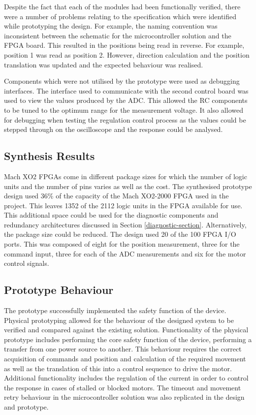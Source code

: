 Despite the fact that each of the modules had been functionally verified, there were a number of problems relating to the specification which were identified while prototyping the design. For example, the naming convention was inconsistent between the schematic for the microcontroller solution and the FPGA board. This resulted in the positions being read in reverse. For example, position 1 was read as position 2. However, direction calculation and the position translation was updated and the expected behaviour was realised.

Components which were not utilised by the prototype were used as debugging interfaces. The interface used to communicate with the second control board was used to view the values produced by the ADC. This allowed the RC components to be tuned to the optimum range for the measurement voltage. It also allowed for debugging when testing the regulation control process as the values could be stepped through on the oscilloscope and the response could be analysed.

\subsection{Synthesis Results}

Mach XO2 FPGAs come in different package sizes for which the number of logic units and the number of pins varies as well as the cost. The synthesised prototype design used 36\% of the capacity of the Mach XO2-2000 FPGA used in the project. This leaves 1352 of the 2112 logic units in the FPGA available for use. This additional space could be used for the diagnostic components and redundancy architectures discussed in Section \ref{diagnostic-section}. Alternatively, the package size could be reduced. The design used 20 of the
100 FPGA I/O ports. This was composed of eight for the position measurement, three for the command input, three for each of the ADC measurements and six for the motor control signals.

\subsection{Prototype Behaviour}
The prototype successfully implemented the safety function of the device. Physical prototyping allowed for the behaviour of the designed system to be verified and compared against the existing solution. Functionality of the physical prototype includes performing the core safety function of the device, performing a transfer from one power source to another. This behaviour requires the correct acquisition of commands and position and calculation  of the required movement as well as the translation of this into a control sequence to drive the motor. Additional functionality includes the regulation of the current in order to control the response in cases of stalled or blocked motors. The timeout and movement retry behaviour in the microcontroller solution was also replicated in the design and prototype.

